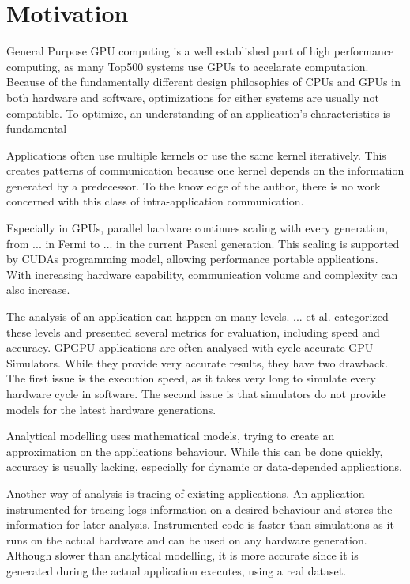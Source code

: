 \chapter{Motivation}
General Purpose GPU computing is a well established part of high performance computing, as many Top500 
systems \cite{} use GPUs to accelarate computation. Because of the fundamentally different design philosophies of CPUs
and GPUs in both hardware and software, optimizations for either systems are usually not compatible. To optimize, an
understanding of an application's characteristics is fundamental

Applications often use multiple kernels or use the same kernel iteratively. This creates patterns of communication because one kernel depends on the information generated by a predecessor. To the knowledge of the author, there is no
work concerned with this class of intra-application communication.

Especially in GPUs, parallel hardware continues scaling with every generation, from ... in Fermi to ... in the current Pascal generation. This scaling is supported by CUDAs programming model, allowing performance portable applications. With increasing hardware capability, communication volume and complexity can also increase.

The analysis of an application can happen on many levels. ... et al. \cite{} categorized these levels and presented several 
metrics for evaluation, including speed and accuracy. GPGPU applications are often analysed with cycle-accurate GPU Simulators. While they provide very accurate results, they have two drawback. 
The first issue is the execution speed, as it takes very long to simulate every hardware cycle in software. 
The second issue is that simulators do not provide models for the latest hardware generations.

Analytical modelling uses mathematical models, trying to create an approximation on the applications behaviour.
While this can be done quickly, accuracy is usually lacking, especially for dynamic or data-depended applications.

Another way of analysis is tracing of existing applications. An application instrumented for tracing logs information
on a desired behaviour and stores the information for later analysis. Instrumented code is faster than simulations as it runs on the actual hardware and can be used on any hardware generation. Although slower than analytical modelling, it is  more accurate since it is generated during the actual application executes, using a real dataset.


